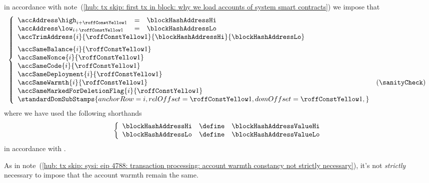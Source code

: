 \item[\underline{\underline{Loading the \inst{BLOCKHASH} system smart contract:}}] 
	in accordance with
	note~(\ref{hub: tx skip: first tx in block: why we load accounts of system smart contracts})
	we impose that
	\[
		\left\{ \begin{array}{lclr}
			\accAddress  \high _{i + \roffTxSkipSysiBlockHashSystemContractAccount} & = & \blockHashAddressHi \\
			\accAddress  \low  _{i + \roffTxSkipSysiBlockHashSystemContractAccount} & = & \blockHashAddressLo \\
			\multicolumn{4}{l}{
				\accTrimAddress
				{i}{\roffTxSkipSysiBlockHashSystemContractAccount}
				{\blockHashAddressHi}
				{\blockHashAddressLo}} \vspace{2mm} \\
			\multicolumn{3}{l}{\accSameBalance                       {i}{\roffTxSkipSysiBlockHashSystemContractAccount}} \\
			\multicolumn{3}{l}{\accSameNonce                         {i}{\roffTxSkipSysiBlockHashSystemContractAccount}} \\
			\multicolumn{3}{l}{\accSameCode                          {i}{\roffTxSkipSysiBlockHashSystemContractAccount}} \\
			\multicolumn{3}{l}{\accSameDeployment                    {i}{\roffTxSkipSysiBlockHashSystemContractAccount}} \\
			\multicolumn{3}{l}{\accSameWarmth                        {i}{\roffTxSkipSysiBlockHashSystemContractAccount}} & (\sanityCheck) \\
			\multicolumn{3}{l}{\accSameMarkedForDeletionFlag         {i}{\roffTxSkipSysiBlockHashSystemContractAccount}} \\
			\multicolumn{3}{l}{
				\standardDomSubStamps {
					anchorRow = i                                             ,
					relOffset = \roffTxSkipSysiBlockHashSystemContractAccount ,
					domOffset = \roffTxSkipSysiBlockHashSystemContractAccount ,
				}
			} \\
		\end{array} \right.
	\]
	where we have used the following shorthands
	\[
		\left\{ \begin{array}{lcl}
			\blockHashAddressHi & \define & \blockHashAddressValueHi \\
			\blockHashAddressLo & \define & \blockHashAddressValueLo \\
		\end{array} \right.
	\]
	in accordance with \cite{EIP-4788}.

	\saNote{}
	As in note~(\ref{hub: tx skip: sysi: eip 4788: transaction processing: account warmth constancy not strictly necessary}),
	it's not \emph{strictly} necessary to impose that the account warmth remain the same.
